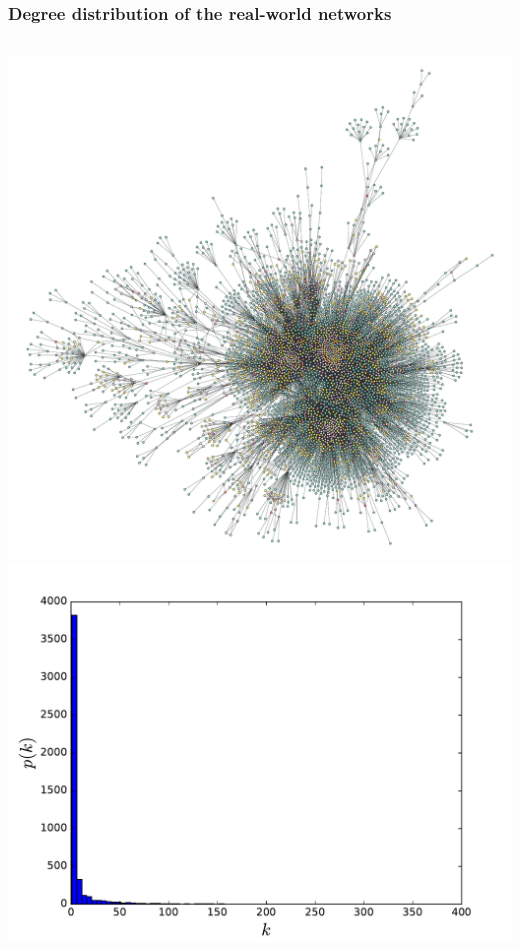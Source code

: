 \documentclass{beamer}
\begin{document}
\begin{frame}
    \frametitle{Degree distribution of the real-world networks}
    \begin{columns}
        \centering
        \includegraphics[width=\columnwidth]{airports_network_global.pdf}
        \includegraphics[width=\columnwidth]{deg_distri_global_airport.pdf}
        \centering
    \end{columns}
\end{frame}
\end{document}
